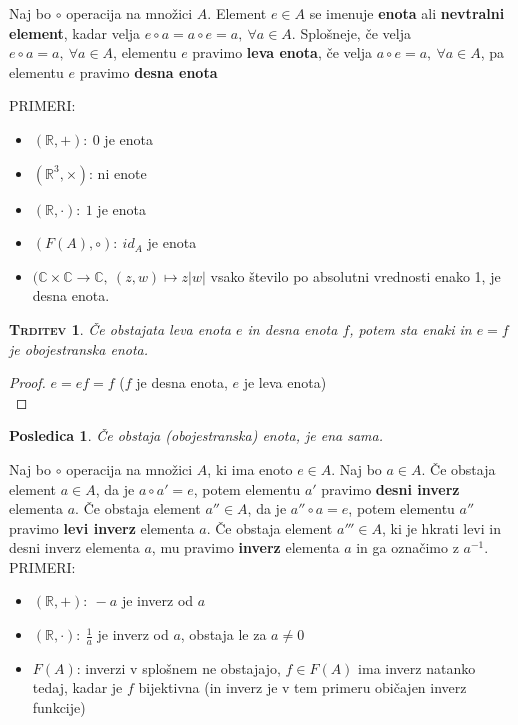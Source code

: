 \documentclass[a4paper,12pt]{article}
\newtheorem*{trditev}{\textsc{Trditev}}
\newtheorem*{posl}{Posledica}
\begin{document}
\noindent Naj bo $\circ$ operacija na množici $A$. Element $e\in A$ se imenuje \textbf{enota} ali \textbf{nevtralni element}, kadar velja $e \circ a = a \circ e = a,~\forall a \in A$. Splošneje, če velja $e \circ a = a,~\forall a \in A$, elementu $e$ pravimo \textbf{leva enota}, če velja $a \circ e = a,~\forall a \in A$, pa elementu $e$ pravimo \textbf{desna enota} \\

\newpage 

\noindent PRIMERI:
\begin{itemize}
\item $(\mathbb{R},+):~0$ je enota
\item $(\mathbb{R}^3, \times)$: ni enote
\item $(\mathbb{R},\cdot):~1$ je enota
\item $(F(A),\circ):~id_A$ je enota
\item $(\mathbb{C} \times \mathbb{C} \to \mathbb{C},~(z,w) \mapsto z|w|$ vsako število po absolutni vrednosti enako 1, je desna enota.\\
\end{itemize}

\begin{trditev}
Če obstajata leva enota $e$ in desna enota $f$, potem sta enaki in $e=f$ je \linebreak obojestranska enota.\\
\end{trditev}

\begin{proof}
$e=ef=f$ ($f$ je desna enota, $e$ je leva enota)\\
\end{proof}

\begin{posl}
Če obstaja (obojestranska) enota, je ena sama.\\
\end{posl}

\noindent Naj bo $\circ$ operacija na množici $A$, ki ima enoto $e\in A$. Naj bo $a \in A$. Če obstaja element $a\in A$, da je $a \circ a' =e$, potem elementu $a'$ pravimo \textbf{desni inverz} elementa $a$. Če obstaja element $a'' \in A$, da je $a'' \circ a = e$, potem elementu $a''$ pravimo \textbf{levi inverz} elementa $a$. Če obstaja element $a''' \in A$, ki je hkrati levi in desni inverz elementa $a$, mu pravimo \textbf{inverz} elementa $a$ in ga označimo z $a^{-1}$. \\

\noindent PRIMERI:
\begin{itemize}
\item $(\mathbb{R},+):~-a$ je inverz od $a$
\item $(\mathbb{R},\cdot):~\frac{1}{a}$ je inverz od $a$, obstaja le za $a\neq 0$
\item $F(A)$: inverzi v splošnem ne obstajajo, $f\in F(A)$ ima inverz natanko tedaj, kadar je $f$ bijektivna (in inverz je v tem primeru običajen inverz funkcije)\\
\end{itemize}
\end{document}
